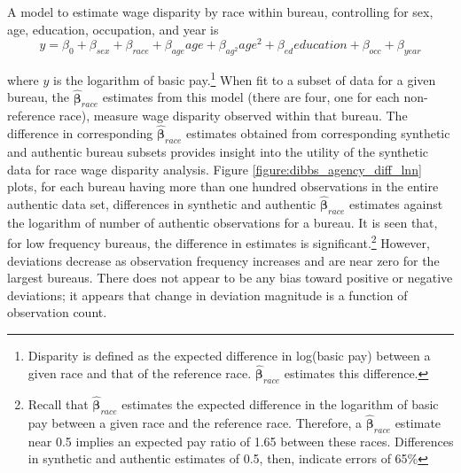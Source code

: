\documentclass[10pt, letterpaper]{article}
\newcommand{\mest}[1]{\hat{\bm{#1}}}
\begin{document}
\begin{spacing}{1.0}
A model to estimate wage disparity by race within bureau, controlling for sex, age, education, occupation, and year is\\[-16pt]

\begin{equation} y=\beta_0+\beta_{sex}+\beta_{race}+\beta_{age}age+\beta_{ag^2}age^2+\beta_{ed}education+\beta_{occ}+\beta_{year}
\label{model:RaceDisparityFEBureau}
\end{equation}

where $y$ is the logarithm of basic pay.\footnote{Disparity is defined as the expected difference in log(basic pay) between a given race and that of the reference race.  $\mest{\beta}_{race}$ estimates this difference.}  When fit to a subset of data for a given bureau, the $\mest{\beta}_{race}$ estimates from this model (there are four, one for each non-reference race), measure wage disparity observed within that bureau.  The difference in corresponding $\mest{\beta}_{race}$ estimates obtained from corresponding synthetic and authentic bureau subsets provides insight into the utility of the synthetic data for race wage disparity analysis.  Figure \ref{figure:dibbs_agency_diff_lnn} plots, for each bureau having more than one hundred observations in the entire authentic data set, differences in synthetic and authentic $\mest{\beta}_{race}$ estimates against the logarithm of number of authentic observations for a bureau.  It is seen that, for low frequency bureaus, the difference in estimates is significant.\footnote{Recall that $\mest{\beta}_{race}$ estimates the expected difference in the logarithm of basic pay between a given race and the reference race.  Therefore, a $\mest{\beta}_{race}$ estimate near 0.5 implies an expected pay ratio of 1.65 between these races.  Differences in synthetic and authentic estimates of 0.5, then, indicate errors of 65\%}  However, deviations decrease as observation frequency increases and are near zero for the largest bureaus.  There does not appear to be any bias toward positive or negative deviations; it appears that change in deviation magnitude is a function of observation count.


\end{spacing}
\end{document}
